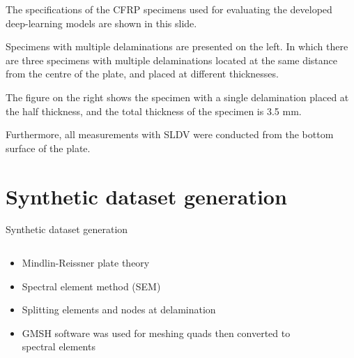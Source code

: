 \documentclass[10pt,aspectratio=169,dvipsnames]{beamer} %
\begin{document}
	\note
	{	
		\footnotesize
		The specifications of the CFRP specimens used for evaluating the developed deep-learning models are shown in this slide.
		
		Specimens with multiple delaminations are presented on the left.
		In which there are three specimens with multiple delaminations located at the same distance from the centre of the plate, and placed at different thicknesses. 
		
		The figure on the right shows the specimen with a single delamination placed at the half thickness, and the total thickness of the specimen is 3.5 mm.
		
		Furthermore, all measurements with SLDV were conducted from the bottom surface of the plate.		
	}	
	\section*{Synthetic dataset generation}
	\setcounter{subfigure}{0}	%
	\begin{frame}{Synthetic dataset generation}
		\begin{columns}[T]			
			\begin{column}{0.55\textwidth}
				\justifying
				\begin{itemize}
					\item Mindlin-Reissner plate theory
					\item Spectral element method (SEM)
					\item Splitting elements and nodes at delamination
					\item GMSH software was used for meshing quads then converted to spectral elements
				\end{itemize}	
				\begin{figure}
				\end{figure}
			\end{column}
			\begin{column}{0.45\textwidth}	
				\begin{figure}
				\end{figure}	
			\end{column}
		\end{columns}	
	\end{frame}
\end{document}
